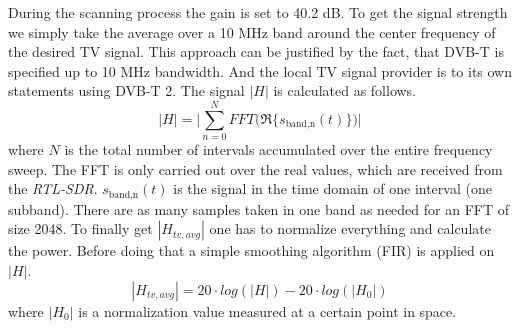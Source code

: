 \documentclass[conference]{IEEEtran}
\begin{document}
During the scanning process the gain is set to 40.2 dB. To get the
signal strength we simply take the average over a 10 MHz band around the
center frequency of the desired TV signal. This approach can be
justified by the fact, that DVB-T is specified up to 10 MHz bandwidth.
And the local TV signal provider is to its own statements using DVB-T 2.
The signal \ensuremath{|H|} is calculated as follows.  
\begin{equation}
	|H| = \Biggl| \sum_{n=0}^N FFT\bigl( \Re\{ s_{\text{band,n}}(t) \} \bigr) \Biggr|
\end{equation}     
where \ensuremath{N} is the total number of intervals accumulated over
the entire frequency sweep. The FFT
is only carried out over the real values, which are received from the
\textit{RTL-SDR}. \ensuremath{s_{\text{band,n}}(t)} is the signal in the
time domain of one interval (one subband). There are as many samples taken in one band as
needed for an FFT of size 2048. To finally get \ensuremath{|H_{tv,avg}|} one has to normalize everything and calculate the power. Before doing that a simple smoothing algorithm (FIR) is applied on \ensuremath{|H|}.
\begin{equation}
	|H_{tv,avg}| = 20 \cdot log (|H|) - 20 \cdot log(|H_0|)
\end{equation}   
where \ensuremath{|H_0|} is a normalization value measured at a certain
point in space. 
\end{document}
